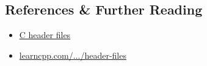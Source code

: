 \subsection*{References \& Further Reading}
\begin{itemize}
\item
	\href{https://www.tutorialspoint.com/cprogramming/c_header_files.htm}{C header files}
\item
	\href{https://www.learncpp.com/cpp-tutorial/header-files/}{learncpp.com/.../header-files}
\end{itemize}